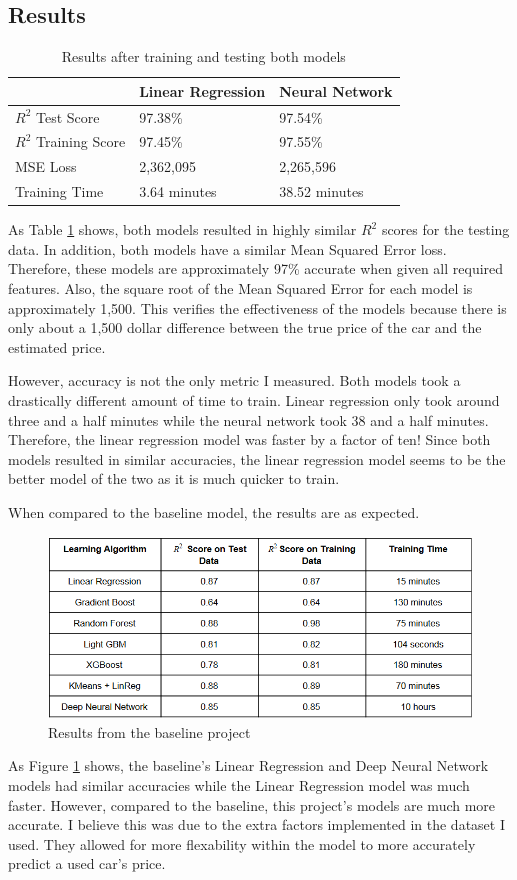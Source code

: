 \documentclass[compsoc]{IEEEtran}
\begin{document}
\subsection{Results}
\begin{table}[h!]
\centering
\begin{tabular}{|l|l|l|}
\hline
                       & Linear Regression & Neural Network \\ \hline
$R^2$ Test Score     & 97.38\%           & 97.54\%        \\ \hline
$R^2$ Training Score & 97.45\%           & 97.55\%        \\ \hline
MSE Loss               & 2,362,095         & 2,265,596      \\ \hline
Training Time          & 3.64 minutes      & 38.52 minutes  \\ \hline
\end{tabular}
\caption{Results after training and testing both models}
\label{table:results}
\end{table}
As Table \ref{table:results} shows, both models resulted in highly similar $R^2$ scores for the testing data. In addition, both models have a similar Mean Squared Error loss. Therefore, these models are approximately 97\% accurate when given all required features. Also, the square root of the Mean Squared Error for each model is approximately 1,500. This verifies the effectiveness of the models because there is only about a 1,500 dollar difference between the true price of the car and the estimated price.

However, accuracy is not the only metric I measured. Both models took a drastically different amount of time to train. Linear regression only took around three and a half minutes while the neural network took 38 and a half minutes. Therefore, the linear regression model was faster by a factor of ten! Since both models resulted in similar accuracies, the linear regression model seems to be the better model of the two as it is much quicker to train.

When compared to the baseline model, the results are as expected.
\begin{figure}[h]
    \centering
    \includegraphics[width=.45\textwidth]{images/baseline_results.png}
    \caption{Results from the baseline project}
    \label{fig:base_result}
\end{figure}
As Figure \ref{fig:base_result} shows, the baseline's Linear Regression and Deep Neural Network models had similar accuracies while the Linear Regression model was much faster. However, compared to the baseline, this project's models are much more accurate. I believe this was due to the extra factors implemented in the dataset I used. They allowed for more flexability within the model to more accurately predict a used car's price.
\end{document}
